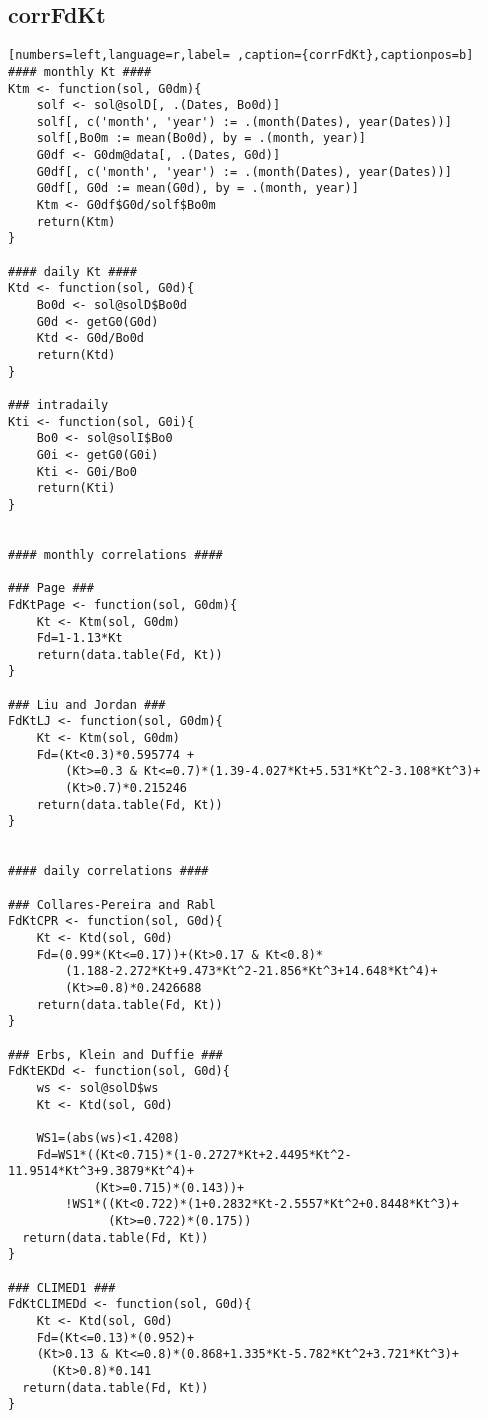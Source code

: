 \subsection{corrFdKt}
\label{sec:orgb211f90}
\begin{lstlisting}[numbers=left,language=r,label= ,caption={corrFdKt},captionpos=b]
#### monthly Kt ####
Ktm <- function(sol, G0dm){
    solf <- sol@solD[, .(Dates, Bo0d)]
    solf[, c('month', 'year') := .(month(Dates), year(Dates))]
    solf[,Bo0m := mean(Bo0d), by = .(month, year)]
    G0df <- G0dm@data[, .(Dates, G0d)]
    G0df[, c('month', 'year') := .(month(Dates), year(Dates))]
    G0df[, G0d := mean(G0d), by = .(month, year)]
    Ktm <- G0df$G0d/solf$Bo0m
    return(Ktm)
}

#### daily Kt ####
Ktd <- function(sol, G0d){
    Bo0d <- sol@solD$Bo0d
    G0d <- getG0(G0d)
    Ktd <- G0d/Bo0d
    return(Ktd)
}

### intradaily
Kti <- function(sol, G0i){
    Bo0 <- sol@solI$Bo0
    G0i <- getG0(G0i)
    Kti <- G0i/Bo0
    return(Kti)
}


#### monthly correlations ####

### Page ###
FdKtPage <- function(sol, G0dm){
    Kt <- Ktm(sol, G0dm)
    Fd=1-1.13*Kt
    return(data.table(Fd, Kt))
}

### Liu and Jordan ###
FdKtLJ <- function(sol, G0dm){
    Kt <- Ktm(sol, G0dm)
    Fd=(Kt<0.3)*0.595774 +
        (Kt>=0.3 & Kt<=0.7)*(1.39-4.027*Kt+5.531*Kt^2-3.108*Kt^3)+
        (Kt>0.7)*0.215246
    return(data.table(Fd, Kt))
}


#### daily correlations ####

### Collares-Pereira and Rabl
FdKtCPR <- function(sol, G0d){
    Kt <- Ktd(sol, G0d)
    Fd=(0.99*(Kt<=0.17))+(Kt>0.17 & Kt<0.8)*
        (1.188-2.272*Kt+9.473*Kt^2-21.856*Kt^3+14.648*Kt^4)+
        (Kt>=0.8)*0.2426688      
    return(data.table(Fd, Kt))
}

### Erbs, Klein and Duffie ###
FdKtEKDd <- function(sol, G0d){
    ws <- sol@solD$ws
    Kt <- Ktd(sol, G0d)

    WS1=(abs(ws)<1.4208)
    Fd=WS1*((Kt<0.715)*(1-0.2727*Kt+2.4495*Kt^2-11.9514*Kt^3+9.3879*Kt^4)+
            (Kt>=0.715)*(0.143))+
        !WS1*((Kt<0.722)*(1+0.2832*Kt-2.5557*Kt^2+0.8448*Kt^3)+
              (Kt>=0.722)*(0.175))
  return(data.table(Fd, Kt))
}

### CLIMED1 ###
FdKtCLIMEDd <- function(sol, G0d){
    Kt <- Ktd(sol, G0d)
    Fd=(Kt<=0.13)*(0.952)+
    (Kt>0.13 & Kt<=0.8)*(0.868+1.335*Kt-5.782*Kt^2+3.721*Kt^3)+
      (Kt>0.8)*0.141
  return(data.table(Fd, Kt))
}


\end{lstlisting}
